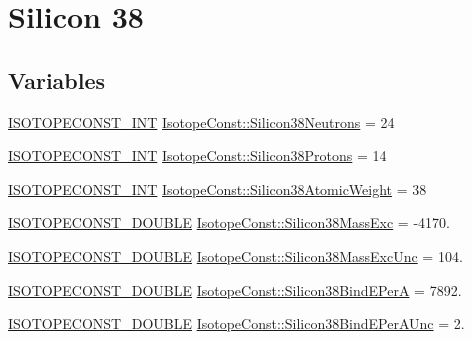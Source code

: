 \hypertarget{group___isotope_const-_silicon-_si38}{}\section{Silicon 38}
\label{group___isotope_const-_silicon-_si38}
\subsection*{Variables}
\begin{DoxyCompactItemize}
\item 
\mbox{\hyperlink{group___isotope_const-_macros_ga5f18360b3e99483a35c32d789e62621c}{I\+S\+O\+T\+O\+P\+E\+C\+O\+N\+S\+T\+\_\+\+I\+NT}} \mbox{\hyperlink{group___isotope_const-_silicon-_si38_ga56f3410779583580f849e56418324a6b}{Isotope\+Const\+::\+Silicon38\+Neutrons}} = 24
\item 
\mbox{\hyperlink{group___isotope_const-_macros_ga5f18360b3e99483a35c32d789e62621c}{I\+S\+O\+T\+O\+P\+E\+C\+O\+N\+S\+T\+\_\+\+I\+NT}} \mbox{\hyperlink{group___isotope_const-_silicon-_si38_gace0f198cd0432f2f703372aa23364110}{Isotope\+Const\+::\+Silicon38\+Protons}} = 14
\item 
\mbox{\hyperlink{group___isotope_const-_macros_ga5f18360b3e99483a35c32d789e62621c}{I\+S\+O\+T\+O\+P\+E\+C\+O\+N\+S\+T\+\_\+\+I\+NT}} \mbox{\hyperlink{group___isotope_const-_silicon-_si38_ga744aa50e20ad5b2b94d9244f6867974f}{Isotope\+Const\+::\+Silicon38\+Atomic\+Weight}} = 38
\item 
\mbox{\hyperlink{group___isotope_const-_macros_ga8f45a7272ce02c0b4c65c44636ed719a}{I\+S\+O\+T\+O\+P\+E\+C\+O\+N\+S\+T\+\_\+\+D\+O\+U\+B\+LE}} \mbox{\hyperlink{group___isotope_const-_silicon-_si38_ga5aba73a582c623023c9a9f0c04732fad}{Isotope\+Const\+::\+Silicon38\+Mass\+Exc}} = -\/4170.
\item 
\mbox{\hyperlink{group___isotope_const-_macros_ga8f45a7272ce02c0b4c65c44636ed719a}{I\+S\+O\+T\+O\+P\+E\+C\+O\+N\+S\+T\+\_\+\+D\+O\+U\+B\+LE}} \mbox{\hyperlink{group___isotope_const-_silicon-_si38_ga38b3d808b22777939b806856908a403e}{Isotope\+Const\+::\+Silicon38\+Mass\+Exc\+Unc}} = 104.
\item 
\mbox{\hyperlink{group___isotope_const-_macros_ga8f45a7272ce02c0b4c65c44636ed719a}{I\+S\+O\+T\+O\+P\+E\+C\+O\+N\+S\+T\+\_\+\+D\+O\+U\+B\+LE}} \mbox{\hyperlink{group___isotope_const-_silicon-_si38_ga7b5aa345679ee81c17a1f7793df5f77f}{Isotope\+Const\+::\+Silicon38\+Bind\+E\+PerA}} = 7892.
\item 
\mbox{\hyperlink{group___isotope_const-_macros_ga8f45a7272ce02c0b4c65c44636ed719a}{I\+S\+O\+T\+O\+P\+E\+C\+O\+N\+S\+T\+\_\+\+D\+O\+U\+B\+LE}} \mbox{\hyperlink{group___isotope_const-_silicon-_si38_gab2608ce071ac1145efcbfdf215d1059f}{Isotope\+Const\+::\+Silicon38\+Bind\+E\+Per\+A\+Unc}} = 2.

\end{DoxyCompactItemize}
